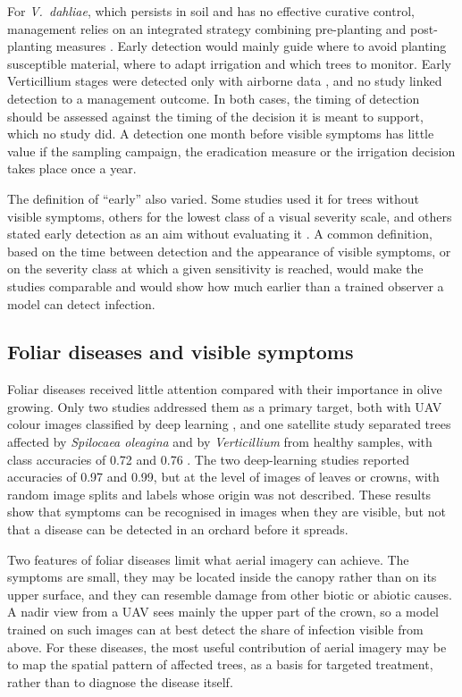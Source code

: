 \documentclass[preprint,12pt]{elsarticle}
\begin{document}
For \textit{V.~dahliae}, which persists in soil and has no effective curative control, management relies on an integrated strategy combining pre-planting and post-planting measures \citep{LopezEscudero2011Verticillium}. Early detection would mainly guide where to avoid planting susceptible material, where to adapt irrigation and which trees to monitor. Early Verticillium stages were detected only with airborne data \citep{u002,u030,u121}, and no study linked detection to a management outcome. In both cases, the timing of detection should be assessed against the timing of the decision it is meant to support, which no study did. A detection one month before visible symptoms has little value if the sampling campaign, the eradication measure or the irrigation decision takes place once a year.

The definition of ``early'' also varied. Some studies used it for trees without visible symptoms, others for the lowest class of a visual severity scale, and others stated early detection as an aim without evaluating it \citep{u021,kallel2022olive}. A common definition, based on the time between detection and the appearance of visible symptoms, or on the severity class at which a given sensitivity is reached, would make the studies comparable and would show how much earlier than a trained observer a model can detect infection.

\subsection{Foliar diseases and visible symptoms}\label{sec:disc_foliar}
Foliar diseases received little attention compared with their importance in olive growing. Only two studies addressed them as a primary target, both with UAV colour images classified by deep learning \citep{u046,u080}, and one satellite study separated trees affected by \textit{Spilocaea oleagina} and by \textit{Verticillium} from healthy samples, with class accuracies of 0.72 and 0.76 \citep{u045}. The two deep-learning studies reported accuracies of 0.97 and 0.99, but at the level of images of leaves or crowns, with random image splits and labels whose origin was not described. These results show that symptoms can be recognised in images when they are visible, but not that a disease can be detected in an orchard before it spreads.

Two features of foliar diseases limit what aerial imagery can achieve. The symptoms are small, they may be located inside the canopy rather than on its upper surface, and they can resemble damage from other biotic or abiotic causes. A nadir view from a UAV sees mainly the upper part of the crown, so a model trained on such images can at best detect the share of infection visible from above. For these diseases, the most useful contribution of aerial imagery may be to map the spatial pattern of affected trees, as a basis for targeted treatment, rather than to diagnose the disease itself.
\end{document}
